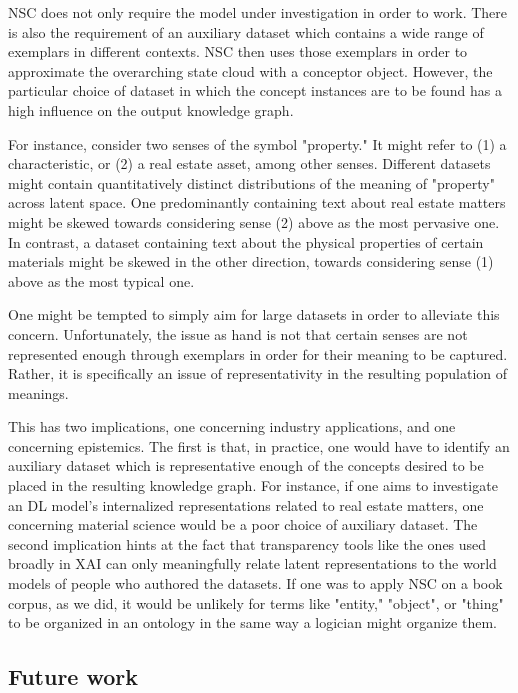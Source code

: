 NSC does not only require the model under investigation in order to work. There is also the requirement of an auxiliary dataset which contains a wide range of exemplars in different contexts. NSC then uses those exemplars in order to approximate the overarching state cloud with a conceptor object. However, the particular choice of dataset in which the concept instances are to be found has a high influence on the output knowledge graph.

For instance, consider two senses of the symbol "property." It might refer to (1) a characteristic, or (2) a real estate asset, among other senses. Different datasets might contain quantitatively distinct distributions of the meaning of "property" across latent space. One predominantly containing text about real estate matters might be skewed towards considering sense (2) above as the most pervasive one. In contrast, a dataset containing text about the physical properties of certain materials might be skewed in the other direction, towards considering sense (1) above as the most typical one.

One might be tempted to simply aim for large datasets in order to alleviate this concern. Unfortunately, the issue as hand is not that certain senses are not represented enough through exemplars in order for their meaning to be captured. Rather, it is specifically an issue of representativity in the resulting population of meanings.

This has two implications, one concerning industry applications, and one concerning epistemics. The first is that, in practice, one would have to identify an auxiliary dataset which is representative enough of the concepts desired to be placed in the resulting knowledge graph. For instance, if one aims to investigate an DL model's internalized representations related to real estate matters, one concerning material science would be a poor choice of auxiliary dataset. The second implication hints at the fact that transparency tools like the ones used broadly in XAI can only meaningfully relate latent representations to the world models of people who authored the datasets. If one was to apply NSC on a book corpus, as we did, it would be unlikely for terms like "entity," "object", or "thing" to be organized in an ontology in the same way a logician might organize them.

\subsection{Future work}

